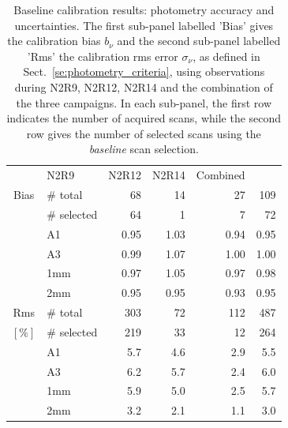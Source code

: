 \documentclass[traditionalabstract]{aa}
\newcommand{\lp}[1]{#1}
\begin{document}
\begin{table}[!thbp]
  \begin{center}
    \caption[Baseline calibration results]{Baseline calibration results:
  photometry accuracy and uncertainties. The first sub-panel labelled 'Bias' gives the
  calibration bias $b_{\nu}$ and the second sub-panel labelled 'Rms' the calibration
  rms error $\sigma_{\nu}$, as defined in
  Sect.~\ref{se:photometry_criteria},
  using observations during N2R9, N2R12, N2R14 and the combination of
  the three campaigns. {\lp In each sub-panel, the first row indicates the
    number of acquired scans, while the second row gives the
    number of selected scans using the \emph{baseline} scan selection.}}
\label{tab:baseline-photometry}
\begin{tabular}{clrrrr}
  \hline\hline
  \noalign{\smallskip}
   \multicolumn{2}{c}{Characteristics} &  N2R9  & N2R12   &  N2R14 & Combined \\
  \noalign{\smallskip}
  \hline
  \noalign{\smallskip}
  Bias &  $\#$ total    &  68    &  14     &   27     &    109    \\
       &  $\#$ selected &  64    &   1     &   7      &     72    \\
       &  A1            &  0.95  &  1.03   &   0.94   &   0.95    \\
       &  A3            &  0.99  &  1.07   &   1.00   &   1.00    \\
       &  1mm           &  0.97  &  1.05   &   0.97   &   0.98    \\
       &  2mm           &  0.95  &  0.95   &   0.93   &   0.95    \\
  \hline
  \noalign{\smallskip}
  Rms  &  $\#$ total    &  303   &  72     &   112    &    487   \\
  $[\%]$ &  $\#$ selected &  219   &  33     &    12    &    264   \\
       &  A1            &  5.7   &  4.6    &   2.9    &    5.5   \\
       &  A3            &  6.2   &  5.7    &   2.4    &    6.0   \\
       &  1mm           &  5.9   &  5.0    &   2.5    &    5.7   \\
       &  2mm           &  3.2   &  2.1    &   1.1    &    3.0   \\  
\hline
\end{tabular}
\end{center}
\end{table}
\end{document}

